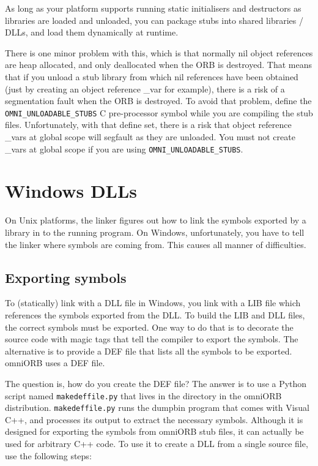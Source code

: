 \documentclass[11pt,oneside,a4paper]{book}
\newcommand{\code}[1]{\texttt{#1}}
\newcommand{\cmdline}[1]{\texttt{#1}}
\begin{document}
As long as your platform supports running static initialisers and
destructors as libraries are loaded and unloaded, you can package
stubs into shared libraries / DLLs, and load them dynamically at
runtime.

There is one minor problem with this, which is that normally nil
object references are heap allocated, and only deallocated when the
ORB is destroyed. That means that if you unload a stub library from
which nil references have been obtained (just by creating an object
reference \_var for example), there is a risk of a segmentation fault
when the ORB is destroyed. To avoid that problem, define the
\code{OMNI\_UNLOADABLE\_STUBS} C pre-processor symbol while you are
compiling the stub files. Unfortunately, with that define set, there
is a risk that object reference \_vars at global scope will segfault
as they are unloaded. You must not create \_vars at global scope if
you are using \code{OMNI\_UNLOADABLE\_STUBS}.


\section{Windows DLLs}

On Unix platforms, the linker figures out how to link the symbols
exported by a library in to the running program. On Windows,
unfortunately, you have to tell the linker where symbols are coming
from. This causes all manner of difficulties.

\subsection{Exporting symbols}

To (statically) link with a DLL file in Windows, you link with a LIB
file which references the symbols exported from the DLL. To build the
LIB and DLL files, the correct symbols must be exported. One way to do
that is to decorate the source code with magic tags that tell the
compiler to export the symbols. The alternative is to provide a DEF
file that lists all the symbols to be exported. omniORB uses a DEF
file.

The question is, how do you create the DEF file?  The answer is to use
a Python script named \cmdline{makedeffile.py} that lives in the
 directory in the omniORB distribution.
\cmdline{makedeffile.py} runs the dumpbin program that comes with
Visual C++, and processes its output to extract the necessary symbols.
Although it is designed for exporting the symbols from omniORB stub
files, it can actually be used for arbitrary C++ code. To use it to
create a DLL from a single source file, use the following steps:
\end{document}
